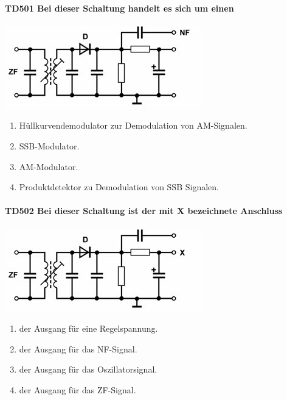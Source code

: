 \documentclass[8pt]{article}
\begin{document}
\begin{enumerate}
\begin{enumerate}[nolistsep,label=\Alph*]
\paragraph*{TD501 Bei dieser Schaltung handelt es sich um einen}
\begin{center}
	\begin{minipage}{\linewidth}
		\centering
		\includegraphics[scale=1.0]{pics/td501_a.jpg}
	\end{minipage}
\end{center}
\begin{enumerate}[nolistsep,label=\Alph*]
\item Hüllkurvendemodulator zur Demodulation von AM-Signalen.
\item SSB-Modulator.
\item AM-Modulator.
\item Produktdetektor zu Demodulation von SSB Signalen.
\end{enumerate}

\paragraph*{TD502 Bei dieser Schaltung ist der mit X bezeichnete Anschluss}
\begin{center}
	\begin{minipage}{\linewidth}
		\centering
		\includegraphics[scale=1.0]{pics/td502_a.jpg}
	\end{minipage}
\end{center}
\begin{enumerate}[nolistsep,label=\Alph*]
\item der Ausgang für eine Regelspannung.
\item der Ausgang für das NF-Signal.
\item der Ausgang für das Oszillatorsignal.
\item der Ausgang für das ZF-Signal.
\end{enumerate}


\end{enumerate}
\end{enumerate}
\end{document}
